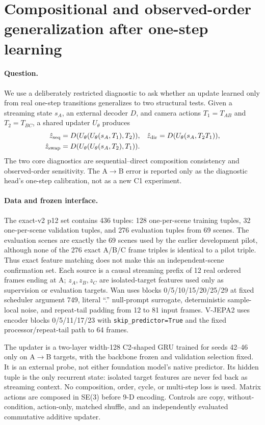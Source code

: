 \section{Compositional and observed-order generalization after one-step learning}
\label{sec:se3_one_step_generalization}

\paragraph{Question.}
We use a deliberately restricted diagnostic to ask whether an update learned only from real one-step transitions generalizes to two structural tests.  Given a streaming state $s_A$, an external decoder $D$, and camera actions $T_1=T_{AB}$ and $T_2=T_{BC}$, a shared updater $U_\theta$ produces
\begin{align}
\hat z_{\rm seq} &= D(U_\theta(U_\theta(s_A,T_1),T_2)), &
\hat z_{\rm dir} &= D(U_\theta(s_A,T_2T_1)),\\
\hat z_{\rm swap} &= D(U_\theta(U_\theta(s_A,T_2),T_1)).
\end{align}
The two core diagnostics are sequential--direct composition consistency and observed-order sensitivity.  The A$\rightarrow$B error is reported only as the diagnostic head's one-step calibration, not as a new C1 experiment.

\paragraph{Data and frozen interface.}
The exact-v2 p12 set contains 436 tuples: 128 one-per-scene training tuples, 32 one-per-scene validation tuples, and 276 evaluation tuples from 69 scenes.  The evaluation scenes are exactly the 69 scenes used by the earlier development pilot, although none of the 276 exact A/B/C frame triples is identical to a pilot triple.  Thus exact feature matching does not make this an independent-scene confirmation set.  Each source is a causal streaming prefix of 12 real ordered frames ending at A; $z_A,z_B,z_C$ are isolated-target features used only as supervision or evaluation targets.  Wan uses blocks 0/5/10/15/20/25/29 at fixed scheduler argument 749, literal ``.'' null-prompt surrogate, deterministic sample-local noise, and repeat-tail padding from 12 to 81 input frames.  V-JEPA2 uses encoder blocks 0/5/11/17/23 with \texttt{skip\_predictor=True} and the fixed processor/repeat-tail path to 64 frames.

The updater is a two-layer width-128 C2-shaped GRU trained for seeds 42--46 only on A$\rightarrow$B targets, with the backbone frozen and validation selection fixed.  It is an external probe, not either foundation model's native predictor.  Its hidden tuple is the only recurrent state: isolated target features are never fed back as streaming context.  No composition, order, cycle, or multi-step loss is used.  Matrix actions are composed in SE(3) before 9-D encoding.  Controls are copy, without-condition, action-only, matched shuffle, and an independently evaluated commutative additive updater.

